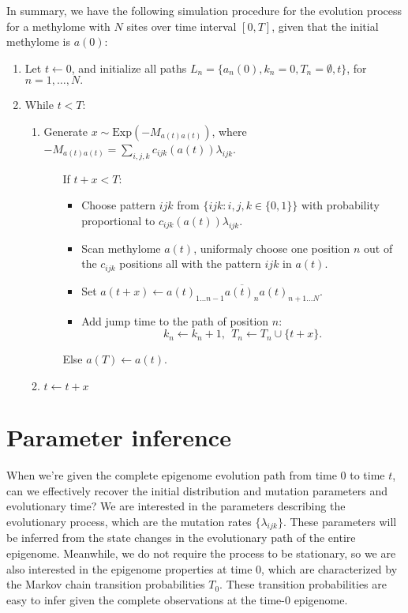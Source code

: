 \documentclass[11pt]{article}
\begin{document}
In summary, we have the following simulation procedure for the evolution
process for a methylome with $N$ sites over time interval $[0, T]$, given
that the initial methylome is $a(0)$:
\begin{enumerate}
\item Let $t \leftarrow 0$, and initialize all paths $L_n = \{a_n(0),
  k_n=0, T_n=\emptyset, t\}$, for $n=1,\ldots, N.$
\item While $t < T$:
  \begin{enumerate}
  \item Generate $x\sim \text{Exp}(-M_{a(t)a(t)})$, where
    $-M_{a(t)a(t)} = \sum\limits_{i,j,k}c_{ijk}(a(t))\lambda_{ijk}$.
    \begin{itemize}
    \item[If] $t+x < T$:
      \begin{itemize}
      \item Choose pattern $ijk$ from $\{ijk: i,j,k\in\{0,1\}\}$ with
        probability proportional to $c_{ijk}(a(t))\lambda_{ijk}$.
      \item Scan methylome $a(t)$, uniformaly choose one position $n$
        out of the $c_{ijk}$ positions all with the pattern $ijk$ in $a(t)$.
      \item Set $a(t+x) \leftarrow a(t)_{1\ldots n-1} \overline{a(t)_n}
        a(t)_{n+1 \ldots N}$.
      \item Add jump time to the path of position $n$: 
        $$k_n \leftarrow k_n +1, ~~ T_n \leftarrow T_n\cup \{t+x\}.$$
      \end{itemize}
    \item[Else] $a(T) \leftarrow a(t)$.
    \end{itemize}
  \item $t \leftarrow t+x$
  \end{enumerate}
\end{enumerate}

\section{Parameter inference} 

When we're given the complete epigenome evolution path from time $0$
to time $t$, can we effectively recover the initial distribution and
mutation parameters and evolutionary time? We are interested in the
parameters describing the evolutionary process, which are the mutation
rates $\{\lambda_{ijk}\}$. These parameters will be inferred from the
state changes in the evolutionary path of the entire
epigenome. Meanwhile, we do not require the process to be stationary,
so we are also interested in the epigenome properties at time 0, which
are characterized by the Markov chain transition probabilities
$T_{0}$. These transition probabilities are easy to infer given the
complete observations at the time-0 epigenome.
\end{document}
